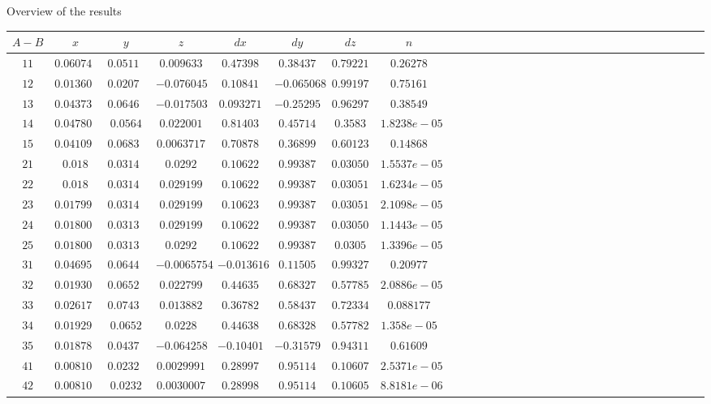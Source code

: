 \documentclass[t,12pt,english
\ifx\beamermode\undefined\else,\beamermode\fi
]{beamer}
\begin{document}
\begin{frame}{Overview of the results}
 

 \begin{table}[!htbp]
\tiny 
\centering

\begin{tabular}{c c c c c c c c c c c c c c c c c c c c c c c c c c c c c c c } 
   \hline 

$A-B $&$ x$&$y$&$z$&$dx$&$dy$&$dz$&$n$\\
\hline 
$11 $&$0.060748$&$0.051155$&$0.009633$&$0.47398$&$     0.38437$&$ 0.79221$&$0.26278$\\
$12 $&$0.013604$&$ 0.020788$&$-0.076045$&$  0.10841$&$-0.065068$&$  0.99197 $&$0.75161$\\
$13 $&$0.043731$&$ 0.064662$&$-0.017503$&$ 0.093271$&$ -0.25295$&$0.96297$&$0.38549$\\
$14 $&$0.047802$&$   0.0564$&$ 0.022001$&$     0.81403$&$0.45714 $&$0.3583$&$1.8238e-05$\\
$15 $&$0.041097$&$  0.06834$&$0.0063717$&$  0.70878$&$0.36899$&$ 0.60123$&$0.14868$\\
$21 $&$0.018    $&$0.031401$&$   0.0292$&$ 0.10622$&$  0.99387$&$ 0.030506$&$ 1.5537e-05$\\
$22 $&$0.018    $&$0.031401$&$ 0.029199 $&$0.10622$&$  0.99387$&$ 0.030513$&$1.6234e-05$\\
$23 $&$0.017999$&$0.031402$&$0.029199$&$0.10623     $&$0.99387$&$0.03051$&$2.1098e-05$\\
$24 $&$0.018001$&$ 0.031399$&$  0.029199$&$   0.10622  $&$  0.99387$&$0.030506$&$1.1443e-05$\\
$25 $&$0.018001$&$ 0.031399$&$   0.0292$&$ 0.10622$&$0.99387$&$0.0305$&$1.3396e-05$\\
$31 $&$0.046955$&$ 0.064436$&$-0.0065754$&$ -0.013616$&$0.11505 $&$0.99327$&$0.20977$\\
$32 $&$0.019301$&$ 0.065201$&$ 0.022799$&$  0.44635$&$0.68327$&$ 0.57785$&$  2.0886e-05$\\
$33 $&$0.026176$&$ 0.074311$&$ 0.013882$&$  0.36782$&$  0.58437$&$ 0.72334 $&$0.088177$\\
$34 $&$0.019299$&$   0.0652$&$   0.0228$&$  0.44638$&$  0.68328 $&$0.57782$&$1.358e-05$\\
$35 $&$0.018783$&$ 0.043797$&$-0.064258$&$-0.10401$&$-0.31579$&$ 0.94311$&$0.61609$\\
$41 $&$0.0081018$&$ 0.023201$&$ 0.0029991$&$  0.28997$&$0.95114$&$0.10607$&$2.5371e-05$\\
$42 $&$0.0081004$&$   0.0232$&$ 0.0030007$&$  0.28998$&$  0.95114 $&$0.10605$&$8.8181e-06$\\

\end{tabular}
\end{table}
\end{frame}
\end{document}

